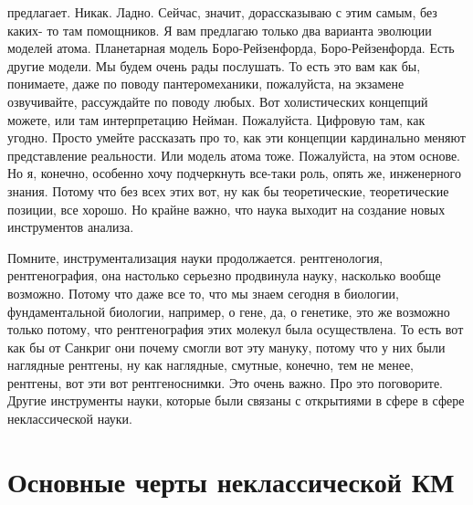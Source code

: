 предлагает. Никак. Ладно. Сейчас, значит, дорассказываю с этим самым, без каких-
то там помощников. Я вам предлагаю только два варианта эволюции моделей атома.
Планетарная модель Боро-Рейзенфорда, Боро-Рейзенфорда. Есть другие модели. Мы
будем очень рады послушать. То есть это вам как бы, понимаете, даже по поводу
пантеромеханики, пожалуйста, на экзамене озвучивайте, рассуждайте по поводу
любых. Вот холистических концепций можете, или там интерпретацию Нейман.
Пожалуйста. Цифровую там, как угодно. Просто умейте рассказать про то, как эти
концепции кардинально меняют представление реальности. Или модель атома тоже.
Пожалуйста, на этом основе. Но я, конечно, особенно хочу подчеркнуть все-таки
роль, опять же, инженерного знания. Потому что без всех этих вот, ну как бы
теоретические, теоретические позиции, все хорошо. Но крайне важно, что наука
выходит на создание новых инструментов анализа. 

Помните, инструментализация
науки продолжается. рентгенология, рентгенография, она настолько серьезно
продвинула науку, насколько вообще возможно. Потому что даже все то, что мы
знаем сегодня в биологии, фундаментальной биологии, например, о гене, да, о
генетике, это же возможно только потому, что рентгенография этих молекул была
осуществлена. То есть вот как бы от Санкриг они почему смогли вот эту мануку,
потому что у них были наглядные рентгены, ну как наглядные, смутные, конечно,
тем не менее, рентгены, вот эти вот рентгеноснимки. Это очень важно. Про это
поговорите. Другие инструменты науки, которые были связаны с открытиями в сфере
в сфере неклассической науки. 

\section{Основные черты неклассической КМ}

